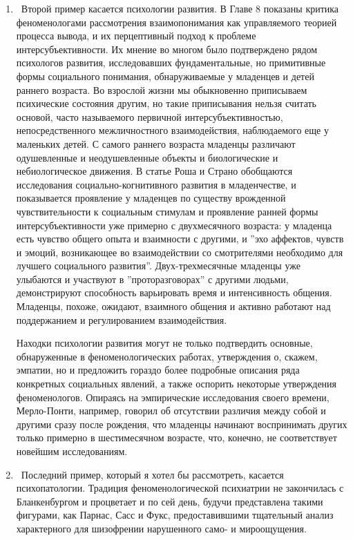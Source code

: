\documentclass[11pt]{book}
\begin{document}
\begin{enumerate}
  \item\ Второй пример касается психологии развития. В Главе 8 показаны критика феноменологами рассмотрения взаимопонимания как управляемого теорией процесса вывода, и их перцептивный подход к проблеме интерсубъективности. Их мнение во многом было подтверждено рядом психологов развития, исследовавших фундаментальные, но примитивные формы социального понимания, обнаруживаемые у младенцев и детей раннего возраста. Во взрослой жизни мы обыкновенно приписываем психические состояния другим, но такие приписывания нельзя считать основой, часто называемого первичной интерсубъективностью, непосредственного межличностного взаимодействия, наблюдаемого еще у маленьких детей. С самого раннего возраста младенцы различают одушевленные и неодушевленные объекты и биологические и небиологическое движения. В статье Роша и Страно обобщаются исследования социально-когнитивного развития в младенчестве, и показывается проявление у младенцев по существу врожденной чувствительности к социальным стимулам и проявление ранней формы интерсубъективности уже примерно с двухмесячного возраста: у младенца есть чувство общего опыта и взаимности с другими, и ''эхо аффектов, чувств и эмоций, возникающее во взаимодействии со смотрителями необходимо для лучшего социального развития''. Двух-трехмесячные младенцы уже улыбаются и участвуют в ''проторазговорах'' с другими людьми, демонстрируют способность варьировать время и интенсивность общения. Младенцы, похоже, ожидают, взаимного общения и активно работают над поддержанием и регулированием взаимодействия.

Находки психологии развития могут не только подтвердить основные, обнаруженные в феноменологических работах, утверждения о, скажем, эмпатии, но и предложить гораздо более подробные описания ряда конкретных социальных явлений, а также оспорить некоторые утверждения феноменологов. Опираясь на эмпирические исследования своего времени, Мерло-Понти, например, говорил об отсутствии различия между собой и другими сразу после рождения, что младенцы начинают воспринимать других только примерно в шестимесячном возрасте, что, конечно, не соответствует новейшим исследованиям.

  \item\ Последний пример, который я хотел бы рассмотреть, касается психопатологии. Традиция феноменологической психиатрии не закончилась с Бланкенбургом и процветает и по сей день, будучи представлена такими фигурами, как Парнас, Сасс и Фукс, предоставившими тщательный анализ характерного для шизофрении нарушенного само- и мироощущения.


\end{enumerate}
\end{document}
